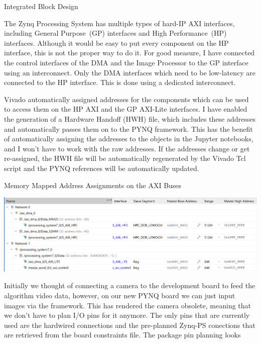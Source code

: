 \documentclass{matthijs}
\begin{document}
\begin{hoofdstuk}{Integrated Block Design}
		\bigskip

		The Zynq Processing System has multiple types of hard-IP AXI interfaces, including General Purpose~(GP) interfaces and High Performance~(HP) interfaces.
		Although it would be easy to put every component on the HP interface, this is not the proper way to do it.
		For good measure, I have connected the control interfaces of the DMA and the Image Processor to the GP interface using an interconnect.
		Only the DMA interfaces which need to be low-latency are connected to the HP interface.
		This is done using a dedicated interconnect.

		\bigskip

		Vivado automatically assigned addresses for the components which can be used to access them on the HP AXI and the GP AXI-Lite interfaces.
		I have enabled the generation of a Hardware Handoff (HWH) file, which includes these addresses and automatically passes them on to the PYNQ framework.
		This has the benefit of automatically assigning the addresses to the objects in the Jupyter notebooks, and I won't have to work with the raw addresses.
		If the addresses change or get re-assigned, the HWH file will be automatically regenerated by the Vivado Tcl script and the PYNQ references will be automatically updated.

		\begin{figuur}{Memory Mapped Address Assignments on the AXI Buses}

			\centerline{
				\includegraphics[width=1.1\textwidth, clip, trim=2pt 0 0 2pt]{vivado-bd-address-map-bad-quality.png}
			}

		\end{figuur}

		Initially we thought of connecting a camera to the development board to feed the algorithm video data, however, on our new PYNQ board we can just input images via the framework.
		This has rendered the camera obsolete, meaning that we don't have to plan I/O pins for it anymore.
		The only pins that are currently used are the hardwired connections and the pre-planned Zynq-PS conections that are retrieved from the board constraints file.
		The package pin planning looks 


\end{hoofdstuk}
\end{document}
